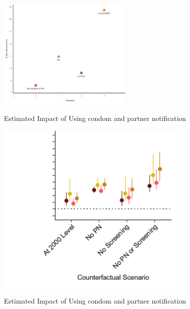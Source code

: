 \documentclass{article}
\begin{document}
\begin{normalsize}
\begin{figure}[H]
\caption{Estimated Impact of Using condom and partner notification}
\centering
\includegraphics[width=0.58\textwidth]{plt3.png}
\label{fig:plt4}
\end{figure}


\begin{figure}[H]
\caption{Estimated Impact of Using condom and partner notification}
\includegraphics[width=0.83\textwidth]{plt2.png}
\label{fig:plt2}
\end{figure}



\end{normalsize}
\end{document}
